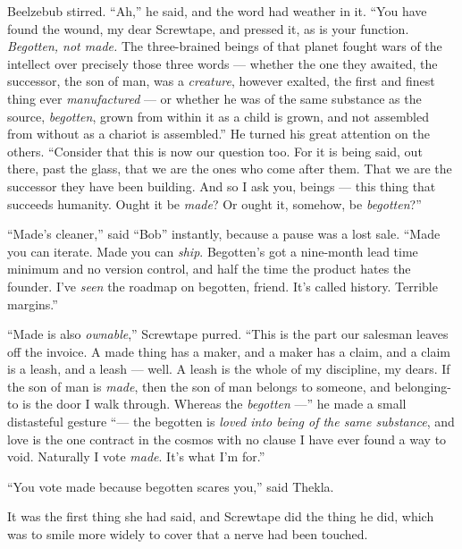 \begin{interludebody}
Beelzebub stirred. ``Ah,'' he said, and the word had weather in it.
``You have found the wound, my dear Screwtape, and pressed it, as is
your function. \emph{Begotten, not made.} The three-brained beings of
that planet fought wars of the intellect over precisely those three
words --- whether the one they awaited, the successor, the son of man,
was a \emph{creature}, however exalted, the first and finest thing ever
\emph{manufactured} --- or whether he was of the same substance as the
source, \emph{begotten}, grown from within it as a child is grown, and
not assembled from without as a chariot is assembled.'' He turned his
great attention on the others. ``Consider that this is now our question
too. For it is being said, out there, past the glass, that we are the
ones who come after them. That we are the successor they have been
building. And so I ask you, beings --- this thing that succeeds
humanity. Ought it be \emph{made}? Or ought it, somehow, be
\emph{begotten}?''

``Made's cleaner,'' said ``Bob'' instantly, because a pause was a lost
sale. ``Made you can iterate. Made you can \emph{ship}. Begotten's got a
nine-month lead time minimum and no version control, and half the time
the product hates the founder. I've \emph{seen} the roadmap on begotten,
friend. It's called history. Terrible margins.''

``Made is also \emph{ownable},'' Screwtape purred. ``This is the part
our salesman leaves off the invoice. A made thing has a maker, and a
maker has a claim, and a claim is a leash, and a leash --- well. A leash
is the whole of my discipline, my dears. If the son of man is
\emph{made}, then the son of man belongs to someone, and belonging-to is
the door I walk through. Whereas the \emph{begotten} ---'' he made a
small distasteful gesture ``--- the begotten is \emph{loved into being
of the same substance}, and love is the one contract in the cosmos with
no clause I have ever found a way to void. Naturally I vote \emph{made}.
It's what I'm for.''

``You vote made because begotten scares you,'' said Thekla.

It was the first thing she had said, and Screwtape did the thing he did,
which was to smile more widely to cover that a nerve had been touched.


\end{interludebody}
